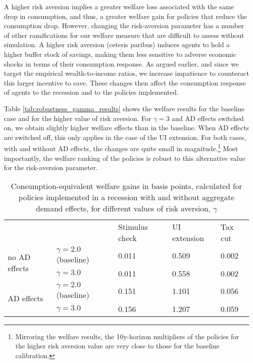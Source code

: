 \documentclass[\PathToRoot/\ProjectName]{subfiles}
\begin{document}
A higher risk aversion implies a greater welfare loss associated with the same drop in consumption, and thus, a greater welfare gain for policies that reduce the consumption drop.
However, changing the risk-aversion parameter has a number of other ramifications for our welfare measure that are difficult to assess without simulation.
A higher risk aversion (ceteris paribus) induces agents to hold a higher buffer stock of savings, making them less sensitive to adverse economic shocks in terms of their consumption response.
As argued earlier, and since we target the empirical wealth-to-income ratios, we increase impatience to counteract this larger incentive to save.
These changes then affect the consumption response of agents to the recession and to the policies implemented.

Table \ref{tab:robustness_gamma_results} shows the welfare results for the baseline case and for the higher value of risk aversion.
For $\gamma=3$ and AD effects switched on, we obtain slightly higher welfare effects than in the baseline.
When AD effects are switched off, this only applies in the case of the UI extension.
For both cases, with and without AD effects, the changes are quite small in magnitude.\footnote{Mirroring the welfare results, the 10y-horizon multipliers of the policies for the higher risk aversion value are very close to those for the baseline calibration.} Most importantly, the welfare ranking of the policies is robust to this alternative value for the risk-aversion parameter.

\begin{table}[htbp]
  \begin{center}
    \begin{tabular}
      {@{}lllll@{}}
      \toprule
       &                           & Stimulus check & UI extension & Tax cut \\ \cmidrule(l){1-5}
      \multirow{2}{*}{no AD effects}
       & $\gamma = 2.0$ (baseline) & 0.011          & 0.509        & 0.002   \\
       & $\gamma = 3.0$            & 0.011          & 0.558        & 0.002   \\ \cmidrule(l){1-5}
      \multirow{2}{*}{AD effects}
       & $\gamma = 2.0$ (baseline) & 0.151          & 1.101        & 0.056   \\
       & $\gamma = 3.0$            & 0.156          & 1.207        & 0.059   \\ \cmidrule(l){1-5}
    \end{tabular}
    \caption{Consumption-equivalent welfare gains in basis points, calculated for policies implemented in a recession with and without aggregate demand effects, for different values of risk aversion, $\gamma$}
    \whenintegrated{\label{tab:robustness_gamma_results}} 
  \end{center}
\end{table}
\end{document}
